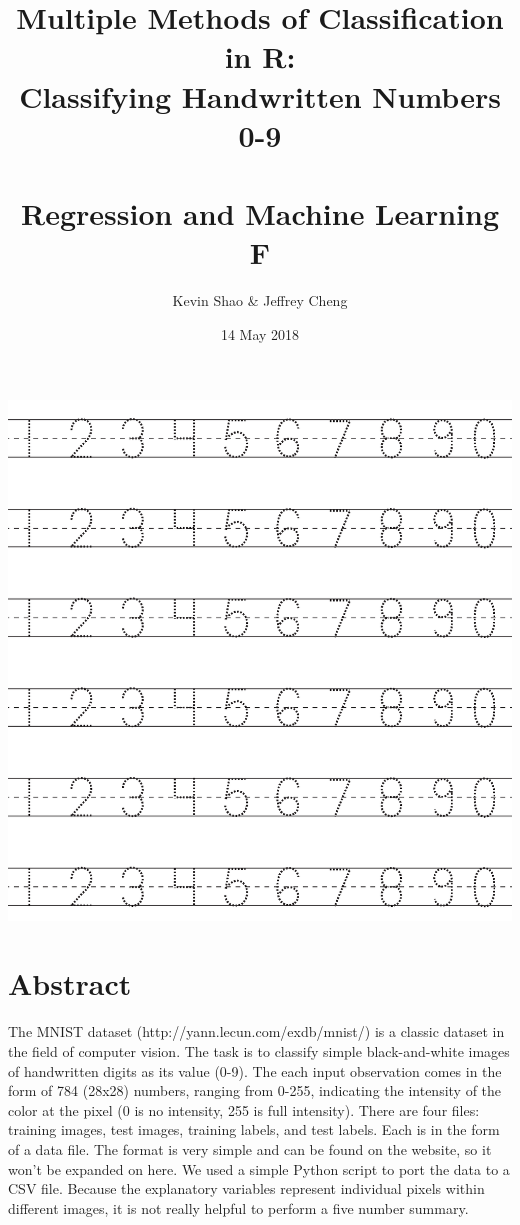 \documentclass[10pt]{extarticle}
\title{Multiple Methods of Classification in R:\\ Classifying Handwritten Numbers 0-9\\\textrm{ }\\\large Regression and Machine Learning F}
\date{14 May 2018}
\author{Kevin Shao \& Jeffrey Cheng}
\begin{document}
\allowdisplaybreaks
{}
\renewcommand{\labelitemi}{$>$}
\maketitle
\begin{center}

\includegraphics[scale=0.5]{numbers.png}

\end{center}
\newpage

\section{Abstract}

The MNIST dataset (http://yann.lecun.com/exdb/mnist/) is a classic dataset in the field of computer vision. The task is to classify simple black-and-white images of handwritten digits as its value (0-9). The each input observation comes in the form of 784 (28x28) numbers, ranging from 0-255, indicating the intensity of the color at the pixel (0 is no intensity, 255 is full intensity). There are four files: training images, test images, training labels, and test labels. Each is in the form of a data file. The format is very simple and can be found on the website, so it won't be expanded on here. We used a simple Python script to port the data to a CSV file.
Because the explanatory variables represent individual pixels within different images, it is not really helpful to perform a five number summary. 
\end{document}
